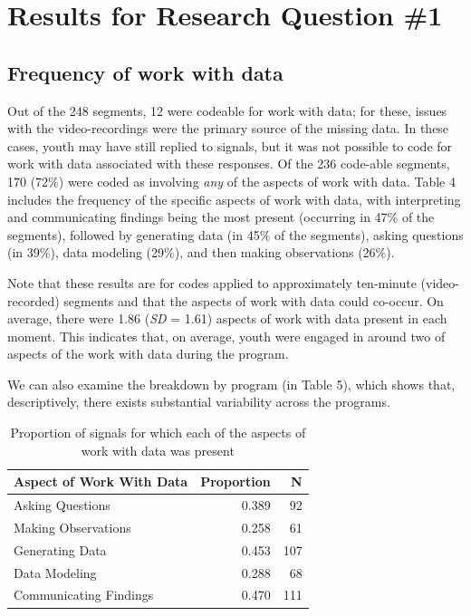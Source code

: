 \documentclass[]{msu-thesis}
\theoremstyle{definition}
\theoremstyle{definition}
\theoremstyle{definition}
\theoremstyle{remark}
\begin{document}
\section{Results for Research Question
\#1}\label{results-for-research-question-1}

\subsection{Frequency of work with
data}\label{frequency-of-work-with-data}

Out of the 248 segments, 12 were codeable for work with data; for these,
issues with the video-recordings were the primary source of the missing
data. In these cases, youth may have still replied to signals, but it
was not possible to code for work with data associated with these
responses. Of the 236 code-able segments, 170 (72\%) were coded as
involving \emph{any} of the aspects of work with data. Table 4 includes
the frequency of the specific aspects of work with data, with
interpreting and communicating findings being the most present
(occurring in 47\% of the segments), followed by generating data (in
45\% of the segments), asking questions (in 39\%), data modeling (29\%),
and then making observations (26\%).

Note that these results are for codes applied to approximately
ten-minute (video-recorded) segments and that the aspects of work with
data could co-occur. On average, there were 1.86 (\emph{SD} = 1.61)
aspects of work with data present in each moment. This indicates that,
on average, youth were engaged in around two of aspects of the work with
data during the program.

We can also examine the breakdown by program (in Table 5), which shows
that, descriptively, there exists substantial variability across the
programs.

\begin{table}

\caption{\label{tab:unnamed-chunk-10}Proportion of signals for which each of the aspects of work with data was present}
\centering
\begin{tabular}[t]{lrr}
\toprule
Aspect of Work With Data & Proportion & N\\
\midrule
Asking Questions & 0.389 & 92\\
Making Observations & 0.258 & 61\\
Generating Data & 0.453 & 107\\
Data Modeling & 0.288 & 68\\
Communicating Findings & 0.470 & 111\\
\bottomrule
\end{tabular}
\end{table}
\end{document}
